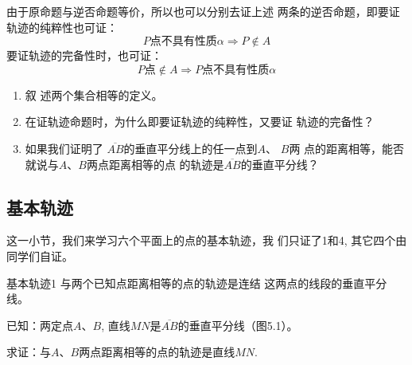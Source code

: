 由于原命题与逆否命题等价，所以也可以分别去证上述
两条的逆否命题，即要证轨迹的纯粹性也可证：
\[P\text{点不具有性质}\alpha\Rightarrow P\notin A\]
要证轨迹的完备性时，也可证：
\[P\text{点}\notin A\Rightarrow P\text{点不具有性质}\alpha\]

\begin{ex}
\begin{enumerate}
\item 叙
述两个集合相等的定义。
\item 在证轨迹命题时，为什么即要证轨迹的纯粹性，又要证
轨迹的完备性？
\item 如果我们证明了
$\overline{AB}$的垂直平分线上的任一点到$A$、
$B$两
点的距离相等，能否就说与$A$、$B$两点距离相等的点
的轨迹是$\overline{AB}$的垂直平分线？
\end{enumerate}
\end{ex}


\subsection{基本轨迹}
这一小节，我们来学习六个平面上的点的基本轨迹，我
们只证了1和4, 其它四个由同学们自证。

\begin{blk}{基本轨迹1}
与两个已知点距离相等的点的轨迹是连结
这两点的线段的垂直平分线。
\end{blk}

已知：两定点$A$、$B$, 直线$MN$是$\overline{AB}$的垂直平分线（图5.1）。

求证：与$A$、$B$两点距离相等的点的轨迹是直线$MN$.

\begin{figure}[htp]
    \centering
{}
    \caption{}
\end{figure}


